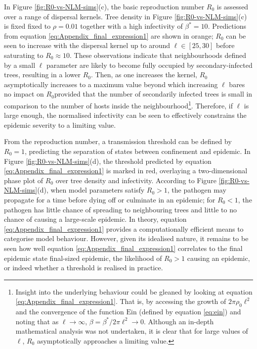 In Figure \ref{fig:R0-vs-NLM-sims}(c), the basic reproduction number $R_0$ is assessed over a range of dispersal kernels.
Tree density in Figure \ref{fig:R0-vs-NLM-sims}(c) is fixed fixed to $\rho=0.01$ together with a high infectivity of $\beta^*=10$.
Predictions from equation \ref{eq:Appendix_final_expression1} are shown in orange;
$R_0$ can be seen to increase with the dispersal kernel up to around $\ell \in [25, 30]$ before saturating to $R_0 \approx 10$. 
These observations indicate that neighbourhoods defined by a small $\ell$ parameter are likely to become fully occupied by secondary-infected trees, resulting in a lower $R_0$.
Then, as one increases the kernel, $R_0$ asymptotically increases to a maximum value beyond which increasing $\ell$ bares no impact on $R_0$\textemdash provided that the number of secondarily infected trees is small in comparison to the number of hosts inside the neighbourhood\footnote{Insight into the underlying behaviour could be gleaned by looking at equation \ref{eq:Appendix_final_expression1}. That is, by accessing the growth of $2\pi \rho_0 \ell^2$ and the convergence of the function $\mathrm{Ein}$ (defined by equation \ref{eq:ein}) and noting that as $\ell \rightarrow \infty$, $\beta=\beta^*/2\pi\ell^2 \rightarrow 0$. Although an in-depth mathematical analysis was not undertaken, it is clear that for large values of $\ell$, $R_0$ asymptotically approaches a limiting value.}.
Therefore, if $\ell$ is large enough, the normalised infectivity can be seen to effectively constrains the epidemic severity to a limiting value.

From the reproduction number, a transmission threshold can be defined by $R_0=1$,  predicting the separation of states between confinement and epidemic.
In Figure \ref{fig:R0-vs-NLM-sims}(d), the threshold predicted by equation \ref{eq:Appendix_final_expression1} is marked in red, overlaying a two-dimensional phase plot of $R_0$ over tree density and infectivity.
According to Figure \ref{fig:R0-vs-NLM-sims}(d), when model parameters satisfy $R_0>1$, the pathogen may propagate for a time before dying off or culminate in an epidemic;
for $R_0<1$, the pathogen has little chance of spreading to neighbouring trees and little to no chance of causing a large-scale epidemic.
In theory, equation \ref{eq:Appendix_final_expression1} provides a computationally efficient means to categorise model behaviour.
However, given its idealised nature, it remains to be seen how well equation \ref{eq:Appendix_final_expression1} correlates to the final epidemic state final-sized epidemic, the likelihood of $R_0>1$ causing an epidemic, or indeed whether a threshold is realised in practice.
